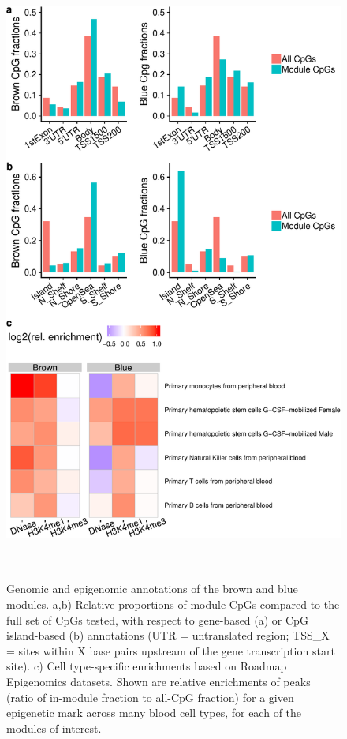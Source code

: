 \documentclass[]{article}
\theoremstyle{definition}
\theoremstyle{definition}
\theoremstyle{definition}
\theoremstyle{remark}
\begin{document}
\begin{figure}[htbp]
\centering
\includegraphics[height=20.5cm]{../doc/module_ewas/figures/brown-and-blue-plots-1.pdf}
\caption{\label{fig:brown-and-blue-plots}Genomic and epigenomic annotations
of the brown and blue modules. a,b) Relative proportions of module CpGs
compared to the full set of CpGs tested, with respect to gene-based (a)
or CpG island-based (b) annotations (UTR = untranslated region; TSS\_X =
sites within X base pairs upstream of the gene transcription start
site). c) Cell type-specific enrichments based on Roadmap Epigenomics
datasets. Shown are relative enrichments of peaks (ratio of in-module
fraction to all-CpG fraction) for a given epigenetic mark across many
blood cell types, for each of the modules of interest.}
\end{figure}
\end{document}
